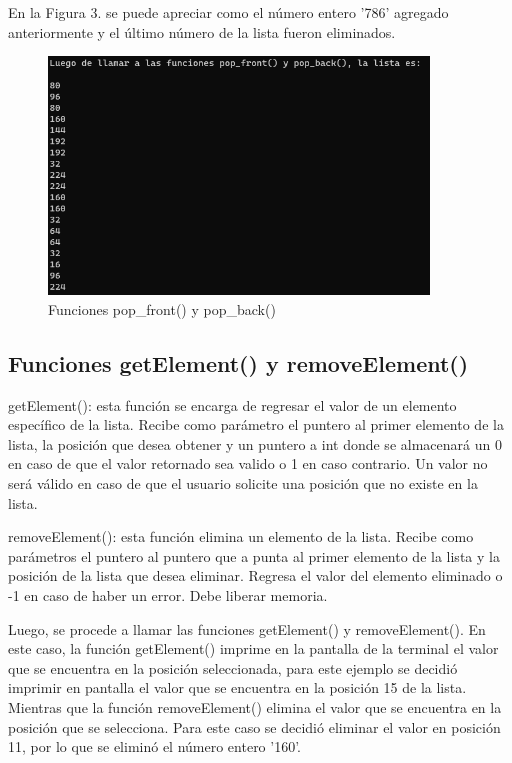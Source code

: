 \documentclass[12pt,a4paper]{article}
\begin{document}
En la Figura 3. se puede apreciar como el número entero '786' agregado anteriormente y el último número de la lista fueron eliminados.

\begin{figure}[H]
    \centering
    \center
    \includegraphics[width=0.9\textwidth]{FotosLabo7/Figura3.png}
    \caption{Funciones pop\_front() y pop\_back() \cite{cap}}
    \label{fig:}
\end{figure}

\subsection{Funciones getElement() y removeElement()}

getElement(): esta función se encarga de regresar el valor de un elemento específico de la lista. Recibe como parámetro el puntero al primer elemento de la lista, la posición que desea obtener y un puntero a int donde se almacenará un 0 en caso de que el valor retornado sea valido o 1 en caso contrario. Un valor no será válido en caso de que el usuario solicite una posición que no existe en la lista.

removeElement(): esta función elimina un elemento de la lista. Recibe como parámetros el puntero al puntero que a punta al primer elemento de la lista y la posición de la lista que desea eliminar. Regresa el valor del elemento eliminado o -1 en caso de haber un error. Debe liberar memoria.

Luego, se procede a llamar las funciones getElement() y removeElement(). En este caso, la función getElement() imprime en la pantalla de la terminal el valor que se encuentra en la posición seleccionada, para este ejemplo se decidió imprimir en pantalla el valor que se encuentra en la posición 15 de la lista. Mientras que la función removeElement() elimina el valor que se encuentra en la posición que se selecciona. Para este caso se decidió eliminar el valor en posición 11, por lo que se eliminó el número entero '160'.
\end{document}
